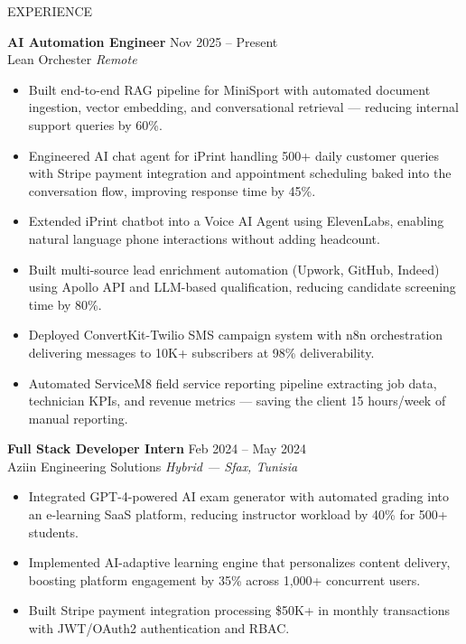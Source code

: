 \documentclass{resume}
\begin{document}

\begin{rSection}{EXPERIENCE}

\textbf{AI Automation Engineer} \hfill Nov 2025 -- Present \\
Lean Orchester \hfill \textit{Remote}
\begin{itemize}
    \itemsep -3pt {}
    \item Built end-to-end RAG pipeline for MiniSport with automated document ingestion, vector embedding, and conversational retrieval — reducing internal support queries by 60\%.
    \item Engineered AI chat agent for iPrint handling 500+ daily customer queries with Stripe payment integration and appointment scheduling baked into the conversation flow, improving response time by 45\%.
    \item Extended iPrint chatbot into a Voice AI Agent using ElevenLabs, enabling natural language phone interactions without adding headcount.
    \item Built multi-source lead enrichment automation (Upwork, GitHub, Indeed) using Apollo API and LLM-based qualification, reducing candidate screening time by 80\%.
    \item Deployed ConvertKit-Twilio SMS campaign system with n8n orchestration delivering messages to 10K+ subscribers at 98\% deliverability.
    \item Automated ServiceM8 field service reporting pipeline extracting job data, technician KPIs, and revenue metrics — saving the client 15 hours/week of manual reporting.
\end{itemize}

\textbf{Full Stack Developer Intern} \hfill Feb 2024 -- May 2024 \\
Aziin Engineering Solutions \hfill \textit{Hybrid — Sfax, Tunisia}
\begin{itemize}
    \itemsep -3pt {}
    \item Integrated GPT-4-powered AI exam generator with automated grading into an e-learning SaaS platform, reducing instructor workload by 40\% for 500+ students.
    \item Implemented AI-adaptive learning engine that personalizes content delivery, boosting platform engagement by 35\% across 1,000+ concurrent users.
    \item Built Stripe payment integration processing \$50K+ in monthly transactions with JWT/OAuth2 authentication and RBAC.
\end{itemize}


\end{rSection}
\end{document}
